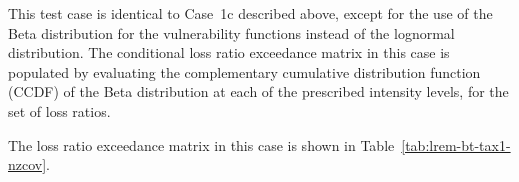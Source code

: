 This test case is identical to Case~1c described above, except for the use of the Beta distribution for the vulnerability functions instead of the lognormal distribution. The conditional loss ratio exceedance matrix in this case is populated by evaluating the complementary cumulative distribution function (CCDF) of the Beta distribution at each of the prescribed intensity levels, for the set of loss ratios.



The loss ratio exceedance matrix in this case is shown in Table~\ref{tab:lrem-bt-tax1-nzcov}.